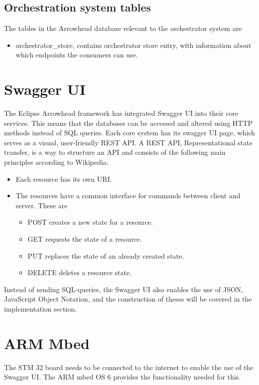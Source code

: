 \subsection{Orchestration system tables}
The tables in the Arrowhead database relevant to the orchestrator system are
\begin{itemize}
    \item orchestrator\_store,  contains orchestrator store entry, with information about which endpoints the consumers can use.
\end{itemize}

\section{Swagger UI}
The Eclipse Arrowhead framework has integrated Swagger UI into their core services. 
This means that the databases can be accessed and altered using HTTP methods instead of SQL queries.
Each core system has its swagger UI page, which serves as a visual, user-friendly REST API. 
A REST API, Representational state transfer, is a way to structure an API and consists of the following main principles according to Wikipedia.\cite{WIKIREST2021}
\begin{itemize}
    \item Each resource has its own URI.
    \item The resources have a common interface for commands between client and server. These are
    \begin{itemize}
        \item POST creates a new state for a resource.
        \item GET requests the state of a resource.
        \item PUT replaces the state of an already created state.
        \item DELETE deletes a resource state.
    \end{itemize}
\end{itemize}
Instead of sending SQL-queries, the Swagger UI also enables the use of JSON, JavaScript Object Notation, and the construction of theses will be covered in the implementation section.
\section{ARM Mbed}
The  STM 32 board needs to be connected to the internet to enable the use of the Swagger UI. 
The ARM mbed OS 6 provides the functionality needed for this. 

